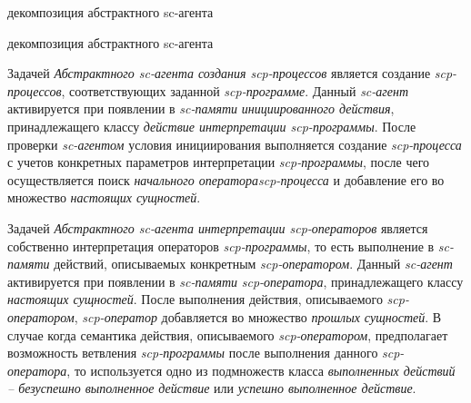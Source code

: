 \begin{SCn}
\begin{scnrelfromset}{декомпозиция абстрактного sc-агента}
	\begin{scnindent}
	\begin{scnrelfromset}{декомпозиция абстрактного sc-агента}		
	\end{scnrelfromset}
	\end{scnindent}
\end{scnrelfromset}
\end{SCn}

Задачей \textit{Абстрактного sc-агента создания scp-процессов} является создание \textit{scp-процессов}, соответствующих заданной \textit{scp-программе}. Данный \textit{\mbox{sc-агент}} активируется при появлении в \textit{sc-памяти} \textit{инициированного действия}, принадлежащего классу \textit{действие интерпретации scp-программы}.  После проверки \textit{sc-агентом} условия инициирования выполняется создание \textit{scp-процесса} с учетов конкретных параметров интерпретации \textit{\mbox{scp-программы}}, после чего осуществляется поиск \textit{начального оператора\scnrolesign \mbox{scp-процесса}} и добавление его во множество \textit{настоящих сущностей}.

Задачей \textit{Абстрактного sc-агента интерпретации scp-операторов} является собственно интерпретация операторов \textit{scp-программы}, то есть выполнение в \textit{sc-памяти} действий, описываемых конкретным \textit{\mbox{scp-оператором}}. Данный \textit{sc-агент} активируется при появлении в \textit{sc-памяти} \textit{scp-оператора}, принадлежащего классу \textit{настоящих сущностей}. После выполнения действия, описываемого \textit{scp-оператором}, \textit{scp-оператор} добавляется во множество \textit{прошлых сущностей}. В случае когда семантика действия, описываемого \textit{\mbox{scp-оператором}}, предполагает возможность ветвления \textit{scp-программы} после выполнения данного \textit{\mbox{scp-оператора}}, то используется одно из подмножеств класса \textit{выполненных действий -- безуспешно выполненное действие} или \textit{успешно выполненное действие}.

